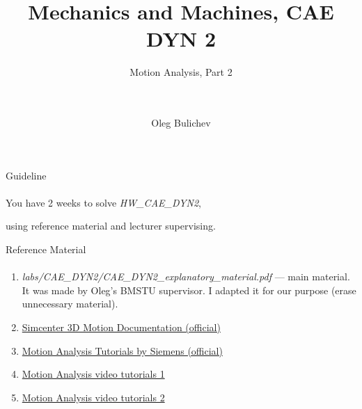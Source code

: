 \documentclass[aspectratio=169]{beamer}
\title[MaM]{Mechanics and Machines, CAE DYN 2} %
\subtitle{Motion Analysis, Part 2
\\ \  \\ \ 
    } %
\author{Oleg Bulichev}
\newcommand{\fbckg}[1]{\usebackgroundtemplate{\texttt{[image: \#1]}}}%
\begin{document}
\setlength{\abovedisplayskip}{0pt}
\setlength{\belowdisplayskip}{0pt}
\setlength{\abovedisplayshortskip}{0pt}
\setlength{\belowdisplayshortskip}{0pt}

\fbckg{fibeamer/figs/title_page.png}

\fbckg{fibeamer/figs/common.png}

\note{\scriptsize
\ 
}

\begin{frame}[c]{Guideline}
\framesubtitle{}
    \centering \LARGE You have 2 weeks to solve \textit{HW\_CAE\_DYN2},
    
    using reference material and lecturer supervising.
\end{frame}

\begin{frame}[t]{Reference Material}
\framesubtitle{}
\begin{enumerate}
    \item \textit{labs/CAE\_DYN2/CAE\_DYN2\_explanatory\_material.pdf} --- main material. It was made by Oleg's BMSTU supervisor. I adapted it for our purpose (erase unnecessary material).
    \item \href{https://docs.sw.siemens.com/en-US/doc/289054037/PL20201105153211099.motion/id563946}{Simcenter 3D Motion Documentation (official)}
    \item \href{https://docs.sw.siemens.com/en-US/doc/289054037/PL20201105153211099.xid1391716/xid1964458}{Motion Analysis Tutorials by Siemens (official)}
    \item \href{https://www.youtube.com/playlist?list=PLY8N5WFx1MGAsxH7G49ey37QC\_nFtQ72E}{Motion Analysis video tutorials 1}
    \item \href{https://www.youtube.com/playlist?list=PL0B-6-amsUZCDepzFMcGETf9pb9CSiqTL}{Motion Analysis video tutorials 2}
\end{enumerate}
\end{frame}

\fbckg{fibeamer/figs/last_page.png}
\frame[plain]{}
\end{document}
